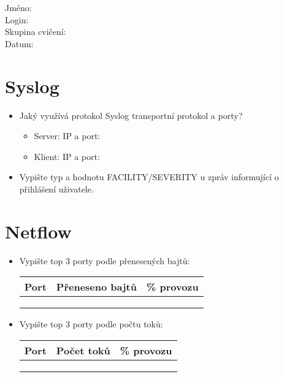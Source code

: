 Jméno:\\
Login:\\
Skupina cvičení:\\
Datum:\\

\section{Syslog}

\begin{itemize}
    \item Jaký využívá protokol Syslog transportní protokol a porty?
    \begin{itemize}
        \item Server: IP a port:
        \item Klient: IP a port:
    \end{itemize}
    \item Vypište typ a hodnotu FACILITY/SEVERITY u zpráv informující o přihlášení uživatele.
    \vspace{2cm}
\end{itemize}

\section{Netflow}

\begin{itemize} 
\item Vypište top 3 porty podle přenesených bajtů: 

\begin{tabular}{|p{2cm}|c|c|}
\hline
Port  & Přeneseno bajtů  & \% provozu \\ \hline
      &                  &        \\   \hline
      &                  &         \\  \hline
      &                  &        \\   \hline
\end{tabular}

\item Vypište top 3 porty podle počtu toků: 

\begin{tabular}{|p{2cm}|c|c|}
\hline
Port  & Počet toků  & \% provozu \\ \hline
      &                  &        \\   \hline
      &                  &         \\  \hline
      &                  &         \\  \hline
\end{tabular}
\end{itemize}

